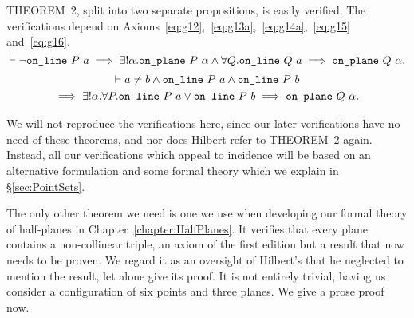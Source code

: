 THEOREM~2, split into two separate propositions, is easily verified. The verifications depend on Axioms~\ref{eq:g12},~\ref{eq:g13a},~\ref{eq:g14a},~\ref{eq:g15} and~\ref{eq:g16}.
\begin{displaymath}
  \vdash\neg\texttt{on\_line}\ P\ a \implies \exists!\alpha. \texttt{on\_plane}\ P\ \alpha \wedge \forall Q. \texttt{on\_line}\ Q\ a \implies \texttt{on\_plane}\ Q\ \alpha.
\end{displaymath}
\begin{multline*}
  \vdash a\neq b\wedge\texttt{on\_line}\ P\ a\wedge\texttt{on\_line}\ P\ b\\
  \implies\exists!\alpha. \forall P. \texttt{on\_line}\ P\ a \vee \texttt{on\_line}\ P\ b \implies\texttt{on\_plane}\ Q\ \alpha.
\end{multline*}

We will not reproduce the verifications here, since our later verifications have no need of these theorems, and nor does Hilbert refer to THEOREM~2 again. Instead, all our verifications which appeal to incidence will be based on an alternative formulation and some formal theory which we explain in \S\ref{sec:PointSets}.

The only other theorem we need is one we use when developing our formal theory of half-planes in Chapter~\ref{chapter:HalfPlanes}. It verifies that every plane contains a non-collinear triple, an axiom of the first edition but a result that now needs to be proven. We regard it as an oversight of Hilbert's that he neglected to mention the result, let alone give its proof. It is not entirely trivial, having us consider a configuration of six points and three planes. We give a prose proof now.

